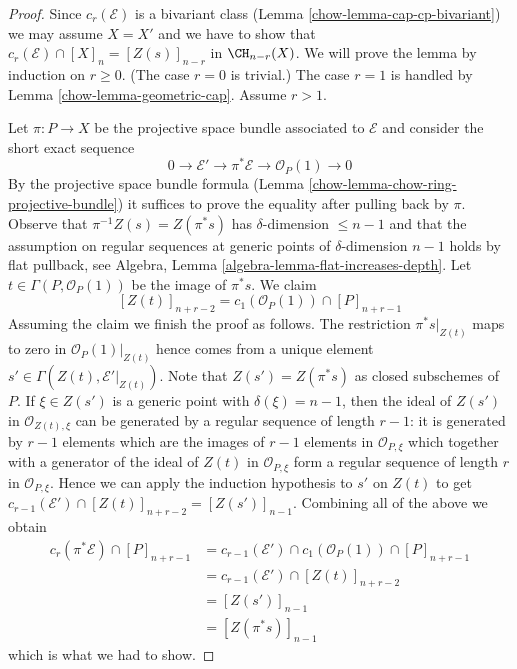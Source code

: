 \begin{proof}

Since $c_r(\mathcal{E})$ is a bivariant class
(Lemma \ref{chow-lemma-cap-cp-bivariant})
we may assume $X = X'$ and we have to show that
$c_r(\mathcal{E}) \cap [X]_n = [Z(s)]_{n - r}$ in $\CH_{n - r}(X)$.
We will prove the lemma by induction on $r \geq 0$. (The case
$r = 0$ is trivial.) The case $r = 1$
is handled by Lemma \ref{chow-lemma-geometric-cap}. Assume $r > 1$.

\medskip\noindent
Let $\pi : P \to X$ be the projective space bundle associated to
$\mathcal{E}$ and consider the short exact sequence
$$
0 \to \mathcal{E}' \to \pi^*\mathcal{E} \to \mathcal{O}_P(1) \to 0
$$
By the projective space bundle formula
(Lemma \ref{chow-lemma-chow-ring-projective-bundle})
it suffices to prove the equality after pulling back by $\pi$.
Observe that $\pi^{-1}Z(s) = Z(\pi^*s)$ has $\delta$-dimension
$\leq n - 1$ and that the assumption on regular sequences at
generic points of $\delta$-dimension $n - 1$ holds by
flat pullback, see
Algebra, Lemma \ref{algebra-lemma-flat-increases-depth}.
Let $t \in \Gamma(P, \mathcal{O}_P(1))$ be the image of $\pi^*s$.
We claim
$$
[Z(t)]_{n + r - 2} = c_1(\mathcal{O}_P(1)) \cap [P]_{n + r - 1}
$$
Assuming the claim we finish the proof as follows.
The restriction $\pi^*s|_{Z(t)}$ maps to zero in
$\mathcal{O}_P(1)|_{Z(t)}$ hence comes from a unique
element $s' \in \Gamma(Z(t), \mathcal{E}'|_{Z(t)})$.
Note that $Z(s') = Z(\pi^*s)$ as closed subschemes of $P$.
If $\xi \in Z(s')$ is a generic point with $\delta(\xi) = n - 1$,
then the ideal of $Z(s')$ in $\mathcal{O}_{Z(t), \xi}$
can be generated by a regular sequence of length $r - 1$: it is generated by
$r - 1$ elements which are the images of $r - 1$ elements in
$\mathcal{O}_{P, \xi}$ which together with a generator of the
ideal of $Z(t)$ in $\mathcal{O}_{P, \xi}$ form a regular sequence
of length $r$ in $\mathcal{O}_{P, \xi}$. Hence we can apply the
induction hypothesis to $s'$ on $Z(t)$ to get
$c_{r - 1}(\mathcal{E}') \cap [Z(t)]_{n + r - 2} = [Z(s')]_{n - 1}$.
Combining all of the above we obtain
\begin{align*}
c_r(\pi^*\mathcal{E}) \cap [P]_{n + r - 1}
& =
c_{r - 1}(\mathcal{E}') \cap c_1(\mathcal{O}_P(1)) \cap [P]_{n + r - 1} \\
& =
c_{r - 1}(\mathcal{E}') \cap [Z(t)]_{n + r - 2} \\
& =
[Z(s')]_{n - 1} \\
& = [Z(\pi^*s)]_{n - 1}
\end{align*}
which is what we had to show.


\end{proof}
